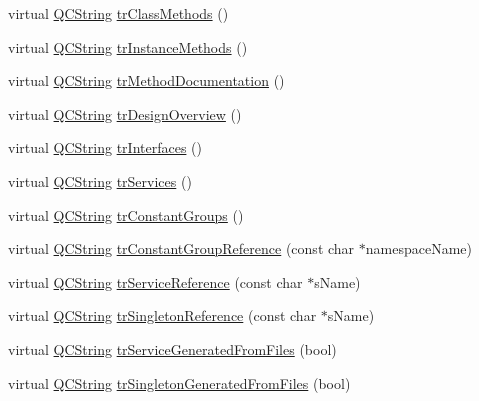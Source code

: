 \begin{DoxyCompactItemize}
\item 
virtual \mbox{\hyperlink{class_q_c_string}{Q\+C\+String}} \mbox{\hyperlink{class_translator_japanese_a0790c233fafbc9884b5061fd3298a153}{tr\+Class\+Methods}} ()
\item 
virtual \mbox{\hyperlink{class_q_c_string}{Q\+C\+String}} \mbox{\hyperlink{class_translator_japanese_a59790428299178e856eedbfab9117ebc}{tr\+Instance\+Methods}} ()
\item 
virtual \mbox{\hyperlink{class_q_c_string}{Q\+C\+String}} \mbox{\hyperlink{class_translator_japanese_aedb0e792f5d6b3b9a50794f1982263ff}{tr\+Method\+Documentation}} ()
\item 
virtual \mbox{\hyperlink{class_q_c_string}{Q\+C\+String}} \mbox{\hyperlink{class_translator_japanese_a87b3e18a60443505018343b719f61679}{tr\+Design\+Overview}} ()
\item 
virtual \mbox{\hyperlink{class_q_c_string}{Q\+C\+String}} \mbox{\hyperlink{class_translator_japanese_ab202913125e78765f22b022c382e1c75}{tr\+Interfaces}} ()
\item 
virtual \mbox{\hyperlink{class_q_c_string}{Q\+C\+String}} \mbox{\hyperlink{class_translator_japanese_a47f643d05a0af26f61d5fbd420f3a464}{tr\+Services}} ()
\item 
virtual \mbox{\hyperlink{class_q_c_string}{Q\+C\+String}} \mbox{\hyperlink{class_translator_japanese_a012b03719809e57b67b162f97337ba70}{tr\+Constant\+Groups}} ()
\item 
virtual \mbox{\hyperlink{class_q_c_string}{Q\+C\+String}} \mbox{\hyperlink{class_translator_japanese_ad998de92c4a5b3e261ba6cdf0e27e8a0}{tr\+Constant\+Group\+Reference}} (const char $\ast$namespace\+Name)
\item 
virtual \mbox{\hyperlink{class_q_c_string}{Q\+C\+String}} \mbox{\hyperlink{class_translator_japanese_a29f95d3285f0f2f7f590a1fe2a8c8af9}{tr\+Service\+Reference}} (const char $\ast$s\+Name)
\item 
virtual \mbox{\hyperlink{class_q_c_string}{Q\+C\+String}} \mbox{\hyperlink{class_translator_japanese_ad3e2169c1f01d73def68f0dfa57b7aa8}{tr\+Singleton\+Reference}} (const char $\ast$s\+Name)
\item 
virtual \mbox{\hyperlink{class_q_c_string}{Q\+C\+String}} \mbox{\hyperlink{class_translator_japanese_a534e4442a40c69f6d6062a15867be6ba}{tr\+Service\+Generated\+From\+Files}} (bool)
\item 
virtual \mbox{\hyperlink{class_q_c_string}{Q\+C\+String}} \mbox{\hyperlink{class_translator_japanese_ae8d24af5ecea3255910984c87d21ddb4}{tr\+Singleton\+Generated\+From\+Files}} (bool)
\end{DoxyCompactItemize}
